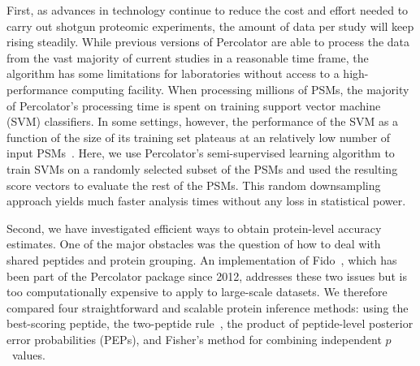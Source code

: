 \documentclass{article}
\begin{document}
First, as advances in technology continue to reduce the cost and
effort needed to carry out shotgun proteomic experiments, the amount
of data per study will keep rising steadily. While previous versions
of Percolator are able to process the data from the vast majority of
current studies in a reasonable time frame, the algorithm has some
limitations for laboratories without access to a high-performance
computing facility. When processing millions of PSMs, the majority of
Percolator's processing time is spent on training support vector
machine (SVM) classifiers.  In some settings, however, the performance
of the SVM as a function of the size of its training set plateaus at
an relatively low number of input PSMs~\cite{gonnelli2015decoy}. Here,
we use Percolator's semi-supervised learning algorithm to train SVMs
on a randomly selected subset of the PSMs and used the resulting score
vectors to evaluate the rest of the PSMs.  This random downsampling
approach yields much faster analysis times without any loss in
statistical power.

Second, we have investigated efficient ways to obtain protein-level 
accuracy estimates. One of the major obstacles was the question of how 
to deal with shared peptides and protein grouping. An implementation 
of Fido~\cite{serang2010efficient}, which has been part of the 
Percolator package since 2012, addresses these two issues but is too 
computationally expensive to apply to large-scale datasets. We 
therefore compared four straightforward and scalable protein inference 
methods: using the best-scoring peptide, the two-peptide 
rule~\cite{carr2004need, gupta2009false}, the product of 
peptide-level posterior error probabilities (PEPs), and Fisher's 
method for combining independent $p$~values.
\end{document}
